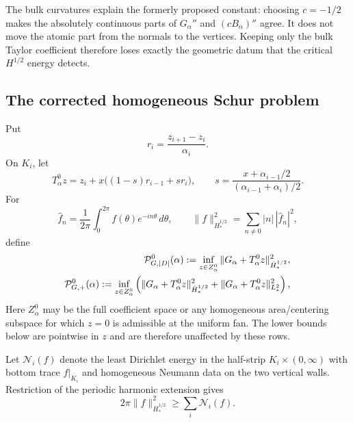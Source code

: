 \begin{remark}
The bulk curvatures explain the formerly proposed constant: choosing
$c=-1/2$ makes the absolutely continuous parts of
$G_\alpha''$ and $(cB_\alpha)''$ agree.  It does not move the atomic part
from the normals to the vertices.  Keeping only the bulk Taylor coefficient
therefore loses exactly the geometric datum that the critical
$H^{1/2}$ energy detects.
\end{remark}

\subsection{The corrected homogeneous Schur problem}

Put
\begin{equation}\label{H0:eq:r}
 r_i=\frac{z_{i+1}-z_i}{\alpha_i}.
\end{equation}
On $K_i$, let
\begin{equation}\label{H0:eq:T0}
 T_\alpha^0z
 =z_i+x\bigl((1-s)r_{i-1}+sr_i\bigr),
 \qquad
 s=\frac{x+\alpha_{i-1}/2}{(\alpha_{i-1}+\alpha_i)/2}.
\end{equation}
For
\begin{equation}
 \widehat f_n=\frac1{2\pi}\int_0^{2\pi}
 f(\theta)e^{-in\theta}\,d\theta,
 \qquad
 \|f\|_{\dot H_*^{1/2}}^2
 =\sum_{n\ne0}|n|\,|\widehat f_n|^2,
\end{equation}
define
\begin{align}
 \mathcal P_{G,|D|}^0(\alpha)
 :=\inf_{z\in Z_\alpha^0}
 \|G_\alpha+T_\alpha^0z\|_{\dot H_*^{1/2}}^2,
 \label{H0:eq:PGdot}\\
 \mathcal P_{G,+}^0(\alpha)
 :=\inf_{z\in Z_\alpha^0}\left(
 \|G_\alpha+T_\alpha^0z\|_{\dot H_*^{1/2}}^2
 +\|G_\alpha+T_\alpha^0z\|_{L_*^2}^2\right),
 \label{H0:eq:PGplus}
\end{align}
Here $Z_\alpha^0$ may be the full coefficient space or any homogeneous
area/centering subspace for which $z=0$ is admissible at the uniform fan.
The lower bounds below are pointwise in $z$ and are therefore unaffected by
these rows.

Let $\mathcal N_i(f)$ denote the least Dirichlet energy in the half-strip
$K_i\times(0,\infty)$ with bottom trace $f|_{K_i}$ and homogeneous Neumann
data on the two vertical walls.  Restriction of the periodic harmonic
extension gives
\begin{equation}\label{H0:eq:strip-localization}
 2\pi\|f\|_{\dot H_*^{1/2}}^2
 \ge\sum_i\mathcal N_i(f).
\end{equation}


